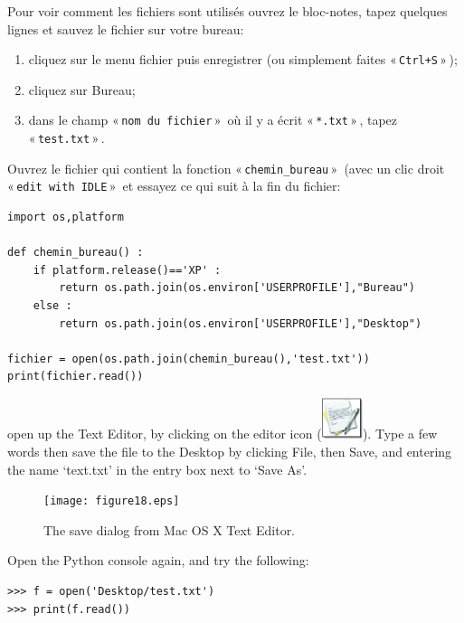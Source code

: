\begin{MAC}
Pour voir comment les fichiers sont utilisés ouvrez le bloc-notes, tapez quelques lignes et sauvez le fichier sur votre bureau:
\begin{enumerate}
\item cliquez sur le menu fichier puis enregistrer (ou simplement faites « \texttt{Ctrl+S} » );
\item cliquez sur Bureau;
\item dans le champ « \texttt{nom du fichier} »  où il y a écrit « \texttt{*.txt} » , tapez « \texttt{test.txt} » .
\end{enumerate}

Ouvrez le fichier qui contient la fonction « \texttt{chemin\_bureau} »  (avec un clic droit « \texttt{edit with IDLE} »  et essayez ce qui suit à la fin du fichier:
\begin{Verbatim}[frame=single,rulecolor=\color{mbleu}, label=à taper]
import os,platform

def chemin_bureau() :
    if platform.release()=='XP' :
        return os.path.join(os.environ['USERPROFILE'],"Bureau")
    else :
        return os.path.join(os.environ['USERPROFILE'],"Desktop")
    
fichier = open(os.path.join(chemin_bureau(),'test.txt'))
print(fichier.read())
\end{Verbatim}


 open up the Text Editor, by clicking on the editor icon (\includegraphics*[width=12mm]{textedit-icon.eps}).  Type a few words then save the file to the Desktop by clicking File, then Save, and entering the name `text.txt' in the entry box next to `Save As'.

\begin{figure}
\begin{center}
\texttt{[image: figure18.eps]}
\end{center}
\caption{The save dialog from Mac OS X Text Editor.}\label{fig18}
\end{figure}

Open the Python console again, and try the following:

\begin{listing}
\begin{verbatim}
>>> f = open('Desktop/test.txt')
>>> print(f.read())
\end{verbatim}
\end{listing}



\end{MAC}

